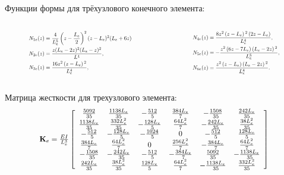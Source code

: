 \documentclass[7pt]{beamer}
\numberwithin{equation}{section}
\newcommand*{\Scale}[2][4]{\scalebox{#1}{$#2$}}
\begin{document}
\begin{frame}
	\begin{block}{Функции формы для трёхузлового конечного элемента:}
			\begin{columns}
				\begin{column}{0.5\textwidth}
					\[
						\Scale[0.65]{
							\begin{split}
								N_{1e}(z)&=\frac{4}{L_{e}^{5}}\left(z-\frac{L_{e}}{2}\right)^{2}(z-L_{e})^{2}(L_e+6 z) \\
								N_{2e}(z)&=\frac{z (L_{e}-2 z)^2 (L_{e}-z)^2}{L^4}, \\
								N_{3e}(z)&=\frac{16 z^2 \left(z-L_e\right){}^2}{L_e^4},\\							
							\end{split}
						}
					\]
				\end{column}
				\begin{column}{0.5\textwidth}
					\[
						\Scale[0.65]{
							\begin{split}
								N_{4e}(z)&=\frac{8 z^2 \left(z-L_e\right){}^2 \left(2 z-L_e\right)}{L_e^4}, \\
								N_{5e}(z)&=-\frac{z^2 \left(6 z-7 L_e\right) \left(L_e-2 z\right){}^2}{L_e^5}, \\
								N_{6e}(z)&=\frac{z^2 \left(z-L_e\right) \left(L_e-2 z\right){}^2}{L_e^4}.
							\end{split}
						}
					\]
				\end{column}
			\end{columns}
	\end{block}
	\begin{block}{Матрица жесткости для трехузлового элемента:}
		\begin{equation*}
			\Scale[0.9] {
				\textbf{K}_e=\frac{EI}{L_e^{3}}
				\left[
				\begin{array}{cccccc}
					\frac{5092}{35} & \frac{1138 L_e}{35} & -\frac{512}{5} & \frac{384 L_e}{7} & -\frac{1508}{35}& \frac{242 L_{e}}{35}\\
						\frac{1138 L_{e}}{35} & \frac{332 L_e^{2}}{35} & -\frac{128 L_e}{5} & \frac{64 L_e^{2}}{7} & -\frac{242 L_{e}}{35}& \frac{38 L_{e}^{2}}{35}\\
					-\frac{512}{5} & -\frac{128 L_e}{5} & -\frac{1024}{5} & 0 & -\frac{512}{5}& \frac{128  L_{e}}{5}\\
						\frac{384 L_{e}}{7} & \frac{64 L_e^{2}}{7} & 0 & \frac{256 L_e^{2}}{7} & -\frac{384 L_{e}}{7}& \frac{64 L_{e}^{2}}{7}\\
					-\frac{1508}{35} & -\frac{242 L_e}{35} & -\frac{512}{5} & -\frac{384 L_{e}}{7} & \frac{5092}{35} &  -\frac{1138  L_{e}}{35}\\
						\frac{242 L_{e}}{35} & \frac{38 L_e^{2}}{35} &  \frac{128 L_e}{5} & \frac{64 L_e^{2}}{7} & -\frac{1138 L_{e}}{35}& \frac{332 L_{e}^{2}}{35}\\
				\end{array}
				\right]
			}
		\end{equation*}
	\end{block}
\end{frame}
\end{document}
